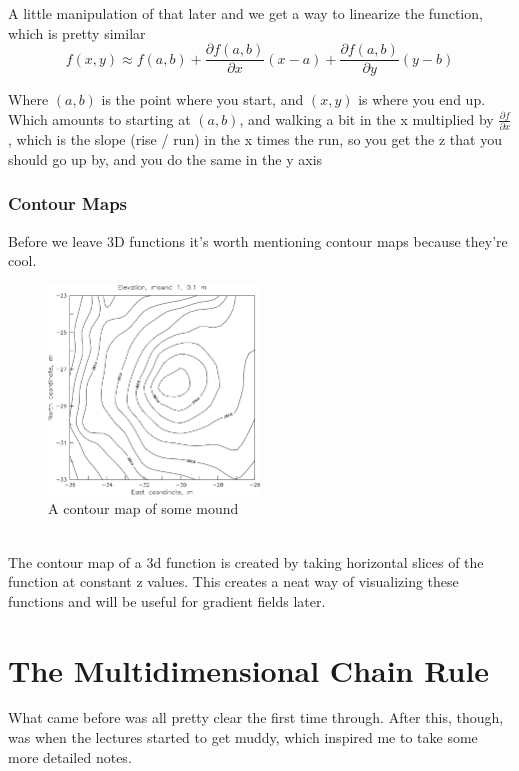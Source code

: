\documentclass[12pt, letterpaper]{article}
\begin{document}
A little manipulation of that later and we get a way to linearize the function, which is pretty similar
\begin{displaymath}
    f(x, y) \approx f(a, b) + \frac{\partial f(a, b)}{\partial x}(x - a) + \frac{\partial f(a, b)}{\partial y}(y - b)
\end{displaymath}

Where $(a, b)$ is the point where you start, and $(x, y)$ is where you end up. Which amounts to starting at $(a, b)$, and walking a bit in the x multiplied by $\frac{\partial f}{\partial x}$, which is the slope (rise / run) in the x times the run, so you get the z that you should go up by, and you do the same in the y axis

\subsubsection{Contour Maps}
Before we leave 3D functions it's worth mentioning contour maps because they're cool.\\
\begin{figure}[h]
    \centering 
    \includegraphics[width=0.5\textwidth]{contourmap}
    \caption{A contour map of some mound}
\end{figure}\\
The contour map of a 3d function is created by taking horizontal slices of the function at constant z values. This creates a neat way of visualizing these functions and will be useful for gradient fields later.

\newpage

\section{The Multidimensional Chain Rule}
What came before was all pretty clear the first time through. After this, though, was when the lectures started to get muddy, which inspired me to take some more detailed notes.
\end{document}
